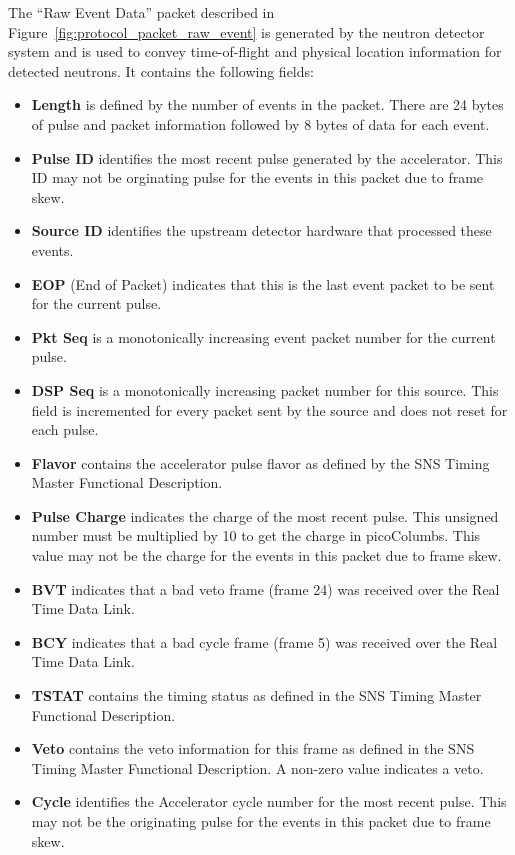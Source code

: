 The ``Raw Event Data'' packet described in
Figure~\ref{fig:protocol_packet_raw_event} is generated by the neutron
detector system and is used to convey time-of-flight and physical location
information for detected neutrons. It contains the following fields:
\begin{itemize}
\item{\bf Length} is defined by the number of events in the packet. There
are 24 bytes of pulse and packet information followed by 8 bytes of data
for each event.
\item{\bf Pulse ID} identifies the most recent pulse generated by the
accelerator. This ID may not be orginating pulse for the events in this packet
due to frame skew.
\item{\bf Source ID} identifies the upstream detector hardware that
processed these events.
\item{\bf EOP} (End of Packet) indicates that this is the last event packet
to be sent for the current pulse.
\item{\bf Pkt Seq} is a monotonically increasing event packet number for the
current pulse.
\item{\bf DSP Seq} is a monotonically increasing packet number for this source.
This field is incremented for every packet sent by the source and does not
reset for each pulse.
\item{\bf Flavor} contains the accelerator pulse flavor as defined by
the SNS Timing Master Functional Description.
\item{\bf Pulse Charge} indicates the charge of the most recent pulse. This
unsigned number must be multiplied by 10 to get the charge in picoColumbs. This
value may not be the charge for the events in this packet due to frame skew.
\item{\bf BVT} indicates that a bad veto frame (frame 24) was received over the
Real Time Data Link.
\item{\bf BCY} indicates that a bad cycle frame (frame 5) was received over the Real Time Data Link.
\item{\bf TSTAT} contains the timing status as defined in the SNS Timing Master
Functional Description.
\item{\bf Veto} contains the veto information for this frame as defined
in the SNS Timing Master Functional Description. A non-zero value indicates
a veto.
\item{\bf Cycle} identifies the Accelerator cycle number for the most
recent pulse. This may not be the originating pulse for the events in this
packet due to frame skew.

\end{itemize}
